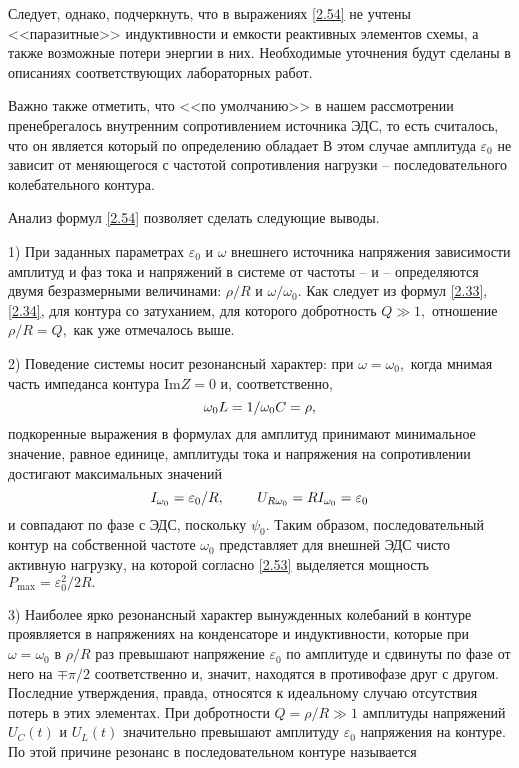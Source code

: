 Следует, однако, подчеркнуть, что в выражениях \eqref{2.54} не учтены <<паразитные>> индуктивности и емкости реактивных элементов схемы, а также возможные потери энергии в них. Необходимые уточнения будут сделаны в описаниях соответствующих лабораторных работ.

Важно также отметить, что <<по умолчанию>> в нашем рассмотрении пренебрегалось внутренним сопротивлением источника ЭДС, то есть считалось, что он является  который по определению обладает  В этом случае амплитуда $\varepsilon_0$ не зависит от меняющегося с частотой сопротивления нагрузки – последовательного колебательного контура.

Анализ формул \eqref{2.54} позволяет сделать следующие выводы.

1) При заданных параметрах $\varepsilon_0$ и $\omega$ внешнего источника напряжения зависимости амплитуд и фаз тока и напряжений в системе от частоты –  и  – определяются двумя безразмерными величинами: $\rho/R$ и $\omega/\omega_0.$ Как следует из формул \eqref{2.33}, \eqref{2.34}, для контура со  затуханием, для которого добротность $Q\gg1,$ отношение $\rho/R=Q,$ как уже отмечалось выше.

2) Поведение системы носит резонансный характер: при $\omega=\omega_0,$ когда мнимая часть импеданса контура $\text{Im}Z=0$ и, соответственно,
\begin{equation}\eqmark{2.55}
	\omega_0L=1/\omega_0C=\rho,
\end{equation}
подкоренные выражения в формулах для амплитуд принимают минимальное значение, равное единице, амплитуды тока и напряжения на сопротивлении достигают максимальных значений
\begin{equation}\eqmark{2.56}
	I_{\omega_0}=\varepsilon_0/R,~~~~~~~U_{R\omega_0}=RI_{\omega_0}=\varepsilon_0
\end{equation}
и совпадают по фазе с ЭДС, поскольку $\psi_0.$ Таким образом, последовательный контур на собственной частоте $\omega_0$ представляет для внешней ЭДС чисто активную нагрузку, на которой согласно \eqref{2.53} выделяется мощность $P_{\text{max}}=\varepsilon_0^2/2R.$

3) Наиболее ярко резонансный характер вынужденных колебаний в  контуре проявляется в напряжениях на конденсаторе и индуктивности, которые при $\omega=\omega_0$ в $\rho/R$ раз превышают напряжение $\varepsilon_0$ по амплитуде и сдвинуты по фазе от него на $\mp\pi/2$ соответственно и, значит, находятся в противофазе друг с другом. Последние утверждения, правда, относятся к идеальному случаю отсутствия потерь в этих элементах. При добротности $Q=\rho/R\gg1$ амплитуды напряжений $U_C(t)$ и $U_L(t)$ значительно превышают амплитуду $\varepsilon_0$ напряжения на контуре. По этой причине резонанс в последовательном контуре называется 

